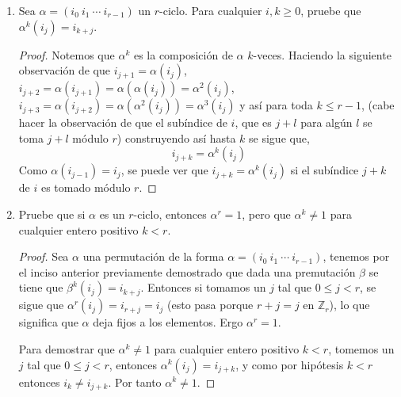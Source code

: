 \documentclass[11pt,letterpaper]{article}
\newcommand{\Z}{\mathbb{Z}}
\begin{document}
\begin{enumerate}[label=\alph*)]
    \item Sea $\alpha = (i_0 \ i_1 \ \cdots \ i_{r-1})$ un $r$-ciclo. Para cualquier $i,k \geq 0$, pruebe que
    $\alpha^k(i_j) = i_{k+j}$.
    \begin{proof}
        Notemos que $\alpha^k$ es la composición de $\alpha$ $k$-veces. Haciendo la siguiente observación de que
        $i_{j+1} = \alpha(i_{j})$, $i_{j+2} = \alpha(i_{j+1}) = \alpha(\alpha(i_{j})) = \alpha^2(i_{j})$,
        $i_{j+3} = \alpha(i_{j+2}) = \alpha(\alpha^2(i_{j})) = \alpha^3(i_{j})$ y así para toda
        $k \leq r-1$, (cabe hacer la observación de que el subíndice de $i$, que es $j + l$ para
        algún $l$ se toma $j + l$ módulo $r$) construyendo así hasta $k$ se sigue que,
        \[
            i_{j+k} = \alpha^k(i_j)
        \]
        Como $\alpha(i_{j-1}) = i_j$, se puede ver que $i_{j+k} = \alpha^k(i_j)$ si el
        subíndice $j+k$ de $i$ es tomado módulo $r$.
    \end{proof}

    \item Pruebe que si $\alpha$ es un $r$-ciclo, entonces $\alpha^r = 1$, pero que $\alpha^k \not= 1$ para
    cualquier entero positivo $k < r$.
    \begin{proof}
        Sea $\alpha$ una permutación de la forma $\alpha = (i_0 \ i_1 \ \cdots \ i_{r-1})$, tenemos por el inciso
        anterior previamente demostrado que dada una premutación $\beta$ se tiene que $\beta^k(i_j) = i_{k+j}$.
        Entonces si tomamos un $j$ tal que $0 \leq j < r$, se sigue que $\alpha^r(i_j) = i_{r+j} = i_{j}$ (esto pasa porque
        $r+j = j$ en $\Z_{r}$), lo que significa que $\alpha$ deja fijos a los elementos. Ergo $\alpha^r = 1$.

        Para demostrar que $\alpha^k \not= 1$ para cualquier entero positivo $k < r$, tomemos un $j$ tal que $0 \leq j < r$,
        entonces $\alpha^k(i_j) = i_{j+k}$, y como por hipótesis $k < r$ entonces $i_k \not= i_{j+k}$.
        Por tanto $\alpha^k \not= 1$.
    \end{proof}


\end{enumerate}
\end{document}
